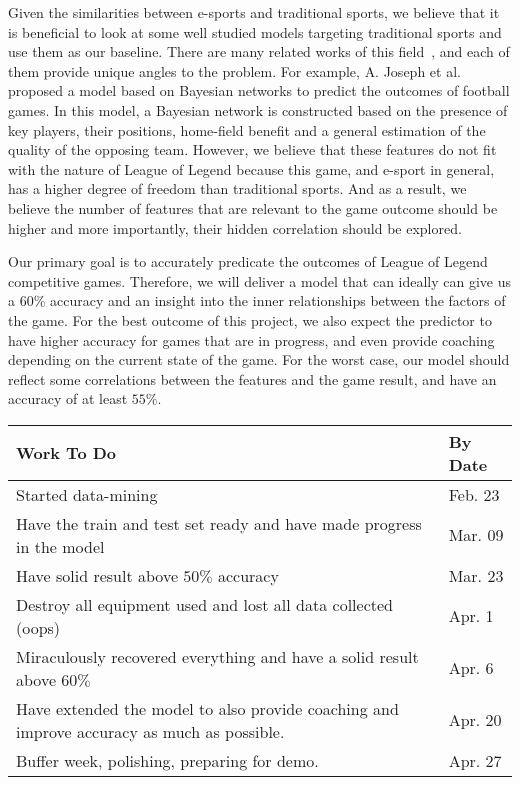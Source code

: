 \documentclass[times, 10pt,twocolumn]{article}
\begin{document}
Given the similarities between e-sports and traditional sports, we believe that it is beneficial to look at some well studied models targeting traditional sports and use them as our baseline. There are many related works of this field~\cite{Joseph2006544}\cite{Min2008551}, and each of them provide unique angles to the problem. For example, {A. Joseph et al.} proposed a model based on Bayesian networks to predict the outcomes of football games. In this model, a Bayesian network is constructed based on the presence of key players, their positions, home-field benefit and a general estimation of the quality of the opposing team. However, we believe that these features do not fit with the nature of League of Legend because this game, and e-sport in general, has a higher degree of freedom than traditional sports. And as a result, we believe the number of features that are relevant to the game outcome should be higher and more importantly, their hidden correlation should be explored.

Our primary goal is to accurately predicate the outcomes of League of Legend competitive games. Therefore, we will deliver a model that can ideally can give us a $60\%$ accuracy and an insight into the inner relationships between the factors of the game. For the best outcome of this project, we also expect the predictor to have higher accuracy for games that are in progress, and even provide coaching depending on the current state of the game. For the worst case, our model should reflect some correlations between the features and the game result, and have an accuracy of at least $55\%$.

\begin{supertabular}{|p{5cm}|p{2cm}|}
    \hline
    Work To Do & By Date \\ \hline
    Started data-mining & Feb. 23 \\ \hline
    Have the train and test set ready and have made progress in the model & Mar. 09 \\ \hline
    Have solid result above $50\%$ accuracy & Mar. 23 \\ \hline
    Destroy all equipment used and lost all data collected (oops) & Apr. 1 \\ \hline
    Miraculously recovered everything and have a solid result above $60\%$ & Apr. 6 \\ \hline
    Have extended the model to also provide coaching and improve accuracy as much as possible. & Apr. 20 \\ \hline
    Buffer week, polishing, preparing for demo. & Apr. 27\\
    \hline
\end{supertabular}



\end{document}
